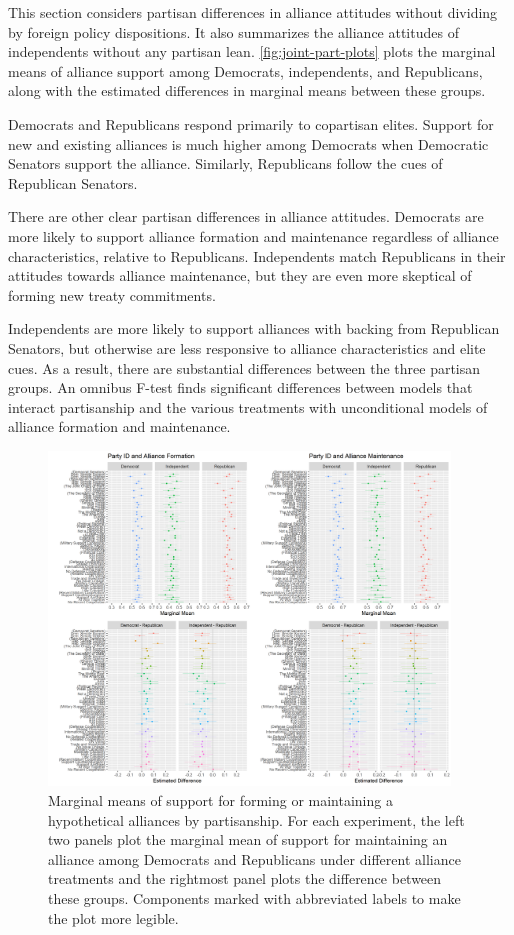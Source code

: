 \documentclass[12pt]{article}
\begin{document}
This section considers partisan differences in alliance attitudes without dividing by foreign policy dispositions. 
It also summarizes the alliance attitudes of independents without any partisan lean. 
\autoref{fig:joint-part-plots} plots the marginal means of alliance support among Democrats, independents, and Republicans, along with the estimated differences in marginal means between these groups. 


Democrats and Republicans respond primarily to copartisan elites.
Support for new and existing alliances is much higher among Democrats when Democratic Senators support the alliance.
Similarly, Republicans follow the cues of Republican Senators.


There are other clear partisan differences in alliance attitudes.
Democrats are more likely to support alliance formation and maintenance regardless of alliance characteristics, relative to Republicans. 
Independents match Republicans in their attitudes towards alliance maintenance, but they are even more skeptical of forming new treaty commitments. 


Independents are more likely to support alliances with backing from Republican Senators, but otherwise are less responsive to alliance characteristics and elite cues. 
As a result, there are substantial differences between the three partisan groups. 
An omnibus F-test finds significant differences between models that interact partisanship and the various treatments with unconditional models of alliance formation and maintenance. 


\begin{figure}
	\centering
		\includegraphics[width=0.95\textwidth]{joint-part-plots.png}
	\caption{Marginal means of support for forming or maintaining a hypothetical alliances by partisanship. For each experiment, the left two panels plot the marginal mean of support for maintaining an alliance among Democrats and Republicans under different alliance treatments and the rightmost panel plots the difference between these groups. Components marked with abbreviated labels to make the plot more legible.}
	\label{fig:joint-part-plots}
\end{figure}
\end{document}
